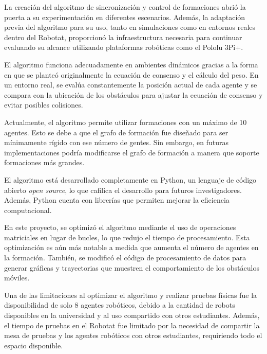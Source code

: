 La creación del algoritmo de sincronización y control de formaciones abrió la puerta a su experimentación en diferentes escenarios. Además, la adaptación previa del algoritmo para su uso, tanto en simulaciones como en entornos reales dentro del Robotat, proporcionó la infraestructura necesaria para continuar evaluando su alcance utilizando plataformas robóticas como el Pololu 3Pi+. 

El algoritmo funciona adecuadamente en ambientes dinámicos gracias a la forma en que se planteó originalmente la ecuación de consenso y el cálculo del peso. En un entorno real, se evalúa constantemente la posición actual de cada agente y se compara con la ubicación de los obstáculos para ajustar la ecuación de consenso y evitar posibles colisiones.

Actualmente, el algoritmo permite utilizar formaciones con un máximo de 10 agentes. Esto se debe a que el grafo de formación fue diseñado para ser mínimamente rígido con ese número de gentes. Sin embargo, en futuras implementaciones podría modificarse el grafo de formación a manera que soporte formaciones más grandes.

El algoritmo está desarrollado completamente en Python, un lenguaje de código abierto \textit{open source}, lo que cafilica el desarrollo para futuros investigadores. Además, Python cuenta con librerías que permiten mejorar la eficiencia computacional.

En este proyecto, se optimizó el algoritmo mediante el uso de operaciones matriciales en lugar de bucles, lo que redujo el tiempo de procesamiento. Esta optimización es aún más notable a medida que aumenta el número de agentes en la formación. También, se modificó el código de procesamiento de datos para generar gráficas y trayectorias que muestren el comportamiento de los obstáculos móviles.

Una de las limitaciones al optimizar el algoritmo y realizar pruebas físicas fue la disponibilidad de solo 8 agentes robóticos, debido a la cantidad de robots disponibles en la universidad y al uso compartido con otros estudiantes. Además, el tiempo de pruebas en el Robotat fue limitado por la necesidad de compartir la mesa de pruebas y los agentes robóticos con otros estudiantes, requiriendo todo el espacio disponible.
